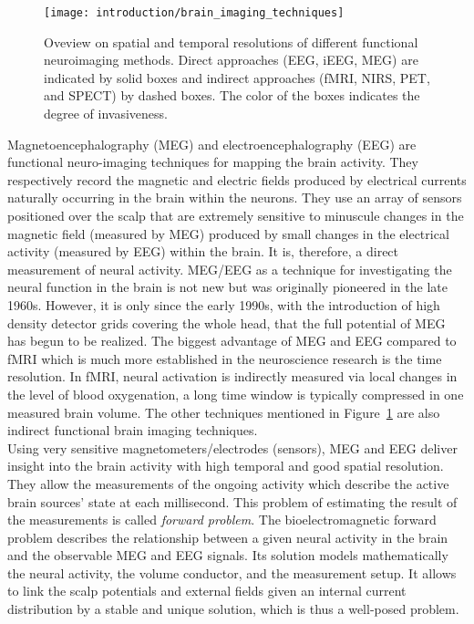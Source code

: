 \begin{figure}
	\texttt{[image: introduction/brain\_imaging\_techniques]}
    \caption{Oveview on spatial and temporal resolutions of different functional neuroimaging methods. Direct approaches (EEG, iEEG, MEG) are indicated by solid boxes and indirect approaches (fMRI, NIRS, PET, and SPECT) by dashed boxes. The color of the boxes indicates the degree of invasiveness.
    }
    \label{fig:brain_imaging_techniques}
\end{figure}
 
Magnetoencephalography (MEG) and electroencephalography (EEG) are functional neuro-imaging techniques for mapping the brain activity. They respectively record the magnetic and electric fields produced by electrical currents naturally occurring in the brain within the neurons. They use an array of sensors positioned over the scalp that are extremely sensitive to minuscule changes in the magnetic field (measured by MEG) produced by small changes in the electrical activity (measured by EEG) within the brain. It is, therefore, a direct measurement of neural activity. MEG/EEG as a technique for investigating the neural function in the brain is not new but was originally pioneered in the late 1960s. However, it is only since the early 1990s, with the introduction of high density detector grids covering the whole head, that the full potential of MEG has begun to be realized. The biggest advantage of MEG and EEG compared to fMRI which is much more established in the neuroscience research is the time resolution. In fMRI, neural activation is indirectly measured via local changes in the level of blood oxygenation, a long time window is typically compressed in one measured brain volume. The other techniques mentioned in Figure~\ref{fig:brain_imaging_techniques} are also indirect functional brain imaging techniques.\\

Using very sensitive magnetometers/electrodes (sensors), MEG and EEG deliver insight into the brain activity with high temporal and good spatial resolution. They allow the measurements of the ongoing activity which describe the active brain sources' state at each millisecond. This problem of estimating the result of the measurements is called \textit{forward problem}. The bioelectromagnetic forward problem describes the relationship between a given neural activity in the brain and the observable MEG and EEG signals. Its solution models mathematically the neural activity, the volume conductor, and the measurement setup. It allows to link the scalp potentials and external fields given an internal current distribution by a stable and unique solution, which is thus a well-posed problem. \\

